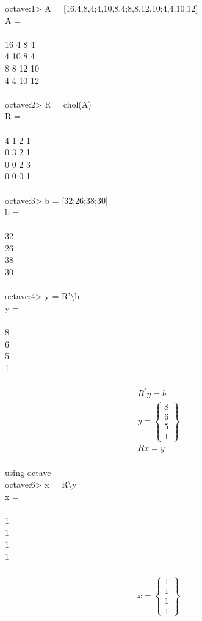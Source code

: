 \documentclass{article}
\begin{document}
	octave:1> A = [16,4,8,4;4,10,8,4;8,8,12,10;4,4,10,12]\\
	A =\\
	\\
	16    4    8    4\\
	4   10    8    4\\
	8    8   12   10\\
	4    4   10   12\\
	\\
	octave:2> R = chol(A)\\
	R =\\
	\\
	4   1   2   1\\
	0   3   2   1\\
	0   0   2   3\\
	0   0   0   1\\
	\\
	octave:3> b = [32;26;38;30]\\
	b =\\
	\\
	32\\
	26\\
	38\\
	30\\
	\\
	octave:4> y = R'\textbackslash b\\
	y =\\
	\\
	8\\
	6\\
	5\\
	1\\
	\\
	\begin{align*}
		R^ty = b\\
		y = \begin{Bmatrix}8\\6\\5\\1\end{Bmatrix}\\
		Rx = y
	\end{align*}
	\\using octave\\
	octave:6> x = R\textbackslash y\\
	x =\\
	\\
	1\\
	1\\
	1\\
	1\\
	\\
	\begin{align*}
		x = \begin{Bmatrix}1\\1\\1\\1\end{Bmatrix}
	\end{align*}
	
\end{document}

